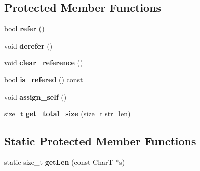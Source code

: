 \subsection*{Protected Member Functions}
\begin{CompactItemize}
\item 
\hypertarget{classvector__string_d39a5f2975e5369e9640a6f4527f8a48}{
bool \textbf{refer} ()}
\label{classvector__string_d39a5f2975e5369e9640a6f4527f8a48}

\item 
\hypertarget{classvector__string_153300feaac04749afc2ed6967683d2e}{
void \textbf{derefer} ()}
\label{classvector__string_153300feaac04749afc2ed6967683d2e}

\item 
\hypertarget{classvector__string_320487eaa54362507dd3873f71002f6a}{
void \textbf{clear\_\-reference} ()}
\label{classvector__string_320487eaa54362507dd3873f71002f6a}

\item 
\hypertarget{classvector__string_a4d48ea0008a394c8332288232a4b186}{
bool \textbf{is\_\-refered} () const }
\label{classvector__string_a4d48ea0008a394c8332288232a4b186}

\item 
\hypertarget{classvector__string_73d2f662e14ad9a73d80b41f18fc6720}{
void \textbf{assign\_\-self} ()}
\label{classvector__string_73d2f662e14ad9a73d80b41f18fc6720}

\item 
\hypertarget{classvector__string_c9392ea4265492df83b40949f268888e}{
size\_\-t \textbf{get\_\-total\_\-size} (size\_\-t str\_\-len)}
\label{classvector__string_c9392ea4265492df83b40949f268888e}

\end{CompactItemize}
\subsection*{Static Protected Member Functions}
\begin{CompactItemize}
\item 
\hypertarget{classvector__string_b665c697e6cf9f10b251330fb75cae9b}{
static size\_\-t \textbf{getLen} (const CharT $\ast$s)}
\label{classvector__string_b665c697e6cf9f10b251330fb75cae9b}

\end{CompactItemize}

